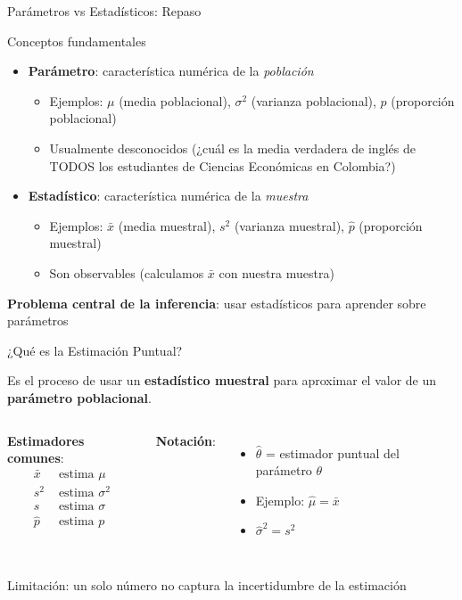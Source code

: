 \documentclass[aspectratio=169, 11pt]{beamer}
\begin{document}
\begin{frame}{Parámetros vs Estadísticos: Repaso}
\begin{block}{Conceptos fundamentales}
\begin{itemize}
  \item \textbf{Parámetro}: característica numérica de la \emph{población}
  \begin{itemize}
    \item Ejemplos: $\mu$ (media poblacional), $\sigma^2$ (varianza poblacional), $p$ (proporción poblacional)
    \item Usualmente \alert{desconocidos} (¿cuál es la media verdadera de inglés de TODOS los estudiantes de Ciencias Econ\'omicas en Colombia?)
  \end{itemize}
  \item \textbf{Estadístico}: característica numérica de la \emph{muestra}
  \begin{itemize}
    \item Ejemplos: $\bar{x}$ (media muestral), $s^2$ (varianza muestral), $\hat{p}$ (proporción muestral)
    \item Son \alert{observables} (calculamos $\bar{x}$ con nuestra muestra)
  \end{itemize}
\end{itemize}
\end{block}

\vspace{0.3cm}
\textbf{Problema central de la inferencia}: usar estadísticos para aprender sobre parámetros
\end{frame}

\begin{frame}{¿Qué es la Estimación Puntual?}
\begin{definition}
Es el proceso de usar un \textbf{estadístico muestral} para aproximar el valor de un \textbf{parámetro poblacional}.
\end{definition}

\vspace{0.3cm}
\begin{columns}[T]
\textbf{Estimadores comunes}:
\begin{align*}
\bar{x} &\text{ estima } \mu \\
s^2 &\text{ estima } \sigma^2 \\
s &\text{ estima } \sigma \\
\hat{p} &\text{ estima } p
\end{align*}

\textbf{Notación}:
\begin{itemize}
  \item $\hat{\theta}$ = estimador puntual del parámetro $\theta$
  \item Ejemplo: $\hat{\mu} = \bar{x}$
  \item $\hat{\sigma}^2 = s^2$
\end{itemize}
\end{columns}

\alert{Limitaci\'on}: un solo n\'umero no captura la incertidumbre de la estimaci\'on
\end{frame}
\end{document}
